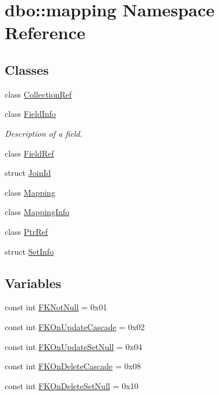 \hypertarget{namespacedbo_1_1mapping}{\section{dbo\+:\+:mapping Namespace Reference}
\label{namespacedbo_1_1mapping}
}
\subsection*{Classes}
\begin{DoxyCompactItemize}
\item 
class \hyperlink{classdbo_1_1mapping_1_1_collection_ref}{Collection\+Ref}
\item 
class \hyperlink{classdbo_1_1mapping_1_1_field_info}{Field\+Info}
\begin{DoxyCompactList}\small\item\em Description of a field. \end{DoxyCompactList}\item 
class \hyperlink{classdbo_1_1mapping_1_1_field_ref}{Field\+Ref}
\item 
struct \hyperlink{structdbo_1_1mapping_1_1_join_id}{Join\+Id}
\item 
class \hyperlink{classdbo_1_1mapping_1_1_mapping}{Mapping}
\item 
class \hyperlink{classdbo_1_1mapping_1_1_mapping_info}{Mapping\+Info}
\item 
class \hyperlink{classdbo_1_1mapping_1_1_ptr_ref}{Ptr\+Ref}
\item 
struct \hyperlink{structdbo_1_1mapping_1_1_set_info}{Set\+Info}
\end{DoxyCompactItemize}
\subsection*{Variables}
\begin{DoxyCompactItemize}
\item 
const int \hyperlink{namespacedbo_1_1mapping_a524c2de86b4169d431af199d866f8331}{F\+K\+Not\+Null} = 0x01
\item 
const int \hyperlink{namespacedbo_1_1mapping_a49684099001aa562bd3f41e20d9130ca}{F\+K\+On\+Update\+Cascade} = 0x02
\item 
const int \hyperlink{namespacedbo_1_1mapping_a382d00e9ad29bb1d14533bf44579ed9b}{F\+K\+On\+Update\+Set\+Null} = 0x04
\item 
const int \hyperlink{namespacedbo_1_1mapping_af0f560be1c6628c4332af57fd0a9890e}{F\+K\+On\+Delete\+Cascade} = 0x08
\item 
const int \hyperlink{namespacedbo_1_1mapping_ab82b6560e26b4e5d430a4c250bd9ff24}{F\+K\+On\+Delete\+Set\+Null} = 0x10
\end{DoxyCompactItemize}


